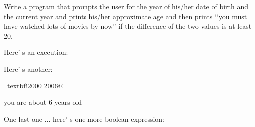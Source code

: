 Write a program that prompts the user for the year of his/her date of birth and the current year and prints his/her approximate age and then prints \lq\lq you must have watched lots of movies by now'' if the difference of the two values is at least 20.



Here' s an execution:




Here' s another:

\begin{console}[commandchars=\~\!\@]

~textbf!2000 2006@

you are about 6 years old

\end{console}





One last one ... here' s one more boolean expression:

\begin{center}

\EMPHASIZE{[expr1] [bool op] [expr2]}

\end{center}

